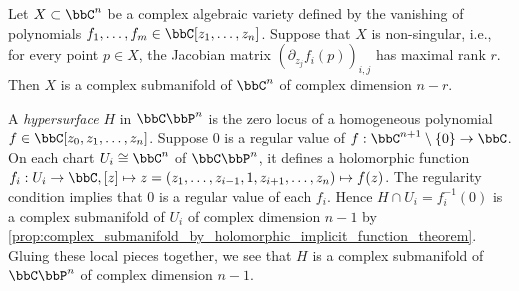 \begin{example}\label{eg:non_singular_complex_algebraic_variety_as_complex_manifold}
	Let \(X \subset \bbC^n\) be a complex algebraic variety defined by the vanishing of polynomials \(f_1, \ldots, f_m \in \bbC[z_1, \ldots, z_n]\).
	Suppose that \(X\) is non-singular, i.e., for every point \(p\in X\), the Jacobian matrix \(\left( \partial_{z_j}f_i(p) \right)_{i,j}\) has maximal rank \(r\).
	Then \(X\) is a complex submanifold of \(\bbC^n\) of complex dimension \(n - r\).
\end{example}

\begin{example}\label{eg:hypersurface_in_CPn_as_complex_manifold}
	A \emph{hypersurface} \(H\) in \(\bbC\bbP^n\) is the zero locus of a homogeneous polynomial \(f \in \bbC[z_0, z_1, \ldots, z_n]\).
	Suppose \(0\) is a regular value of \(f: \bbC^{n+1}\setminus \{0\} \to \bbC\).
	On each chart \(U_i \cong \bbC^n\) of \(\bbC\bbP^n\), it defines a holomorphic function \(f_i: U_i \to \bbC, [z] \mapsto z = (z_1, \ldots, z_{i-1}, 1, z_{i+1}, \ldots, z_n) \mapsto f(z)\).
	The regularity condition implies that \(0\) is a regular value of each \(f_i\).
	Hence \(H \cap U_i = f_i^{-1}(0)\) is a complex submanifold of \(U_i\) of complex dimension \(n-1\) by \cref{prop:complex_submanifold_by_holomorphic_implicit_function_theorem}.
	Gluing these local pieces together, we see that \(H\) is a complex submanifold of \(\bbC\bbP^n\) of complex dimension \(n-1\).
\end{example}

